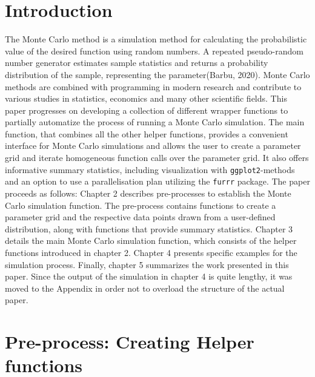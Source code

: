 \documentclass[11pt,a4paper]{article}
\begin{document}
\restoregeometry


{
\hypersetup{linkcolor=black}
\setcounter{tocdepth}{3}
\tableofcontents
}
\newpage
\listoftables
\newpage
\listoffigures
\newpage
{} 
\hypertarget{introduction}{%
\section{Introduction}\label{introduction}}

The Monte Carlo method is a simulation method for calculating the
probabilistic value of the desired function using random numbers. A
repeated pseudo-random number generator estimates sample statistics and
returns a probability distribution of the sample, representing the
parameter(Barbu, 2020). Monte Carlo methods are combined with
programming in modern research and contribute to various studies in
statistics, economics and many other scientific fields. This paper
progresses on developing a collection of different wrapper functions to
partially automatize the process of running a Monte Carlo simulation.
The main function, that combines all the other helper functions,
provides a convenient interface for Monte Carlo simulations and allows
the user to create a parameter grid and iterate homogeneous function
calls over the parameter grid. It also offers informative summary
statistics, including visualization with \texttt{ggplot2}-methods and an
option to use a parallelisation plan utilizing the \texttt{furrr}
package. The paper proceeds as follows: Chapter 2 describes
pre-processes to establish the Monte Carlo simulation function. The
pre-process contains functions to create a parameter grid and the
respective data points drawn from a user-defined distribution, along
with functions that provide summary statistics. Chapter 3 details the
main Monte Carlo simulation function, which consists of the helper
functions introduced in chapter 2. Chapter 4 presents specific examples
for the simulation process. Finally, chapter 5 summarizes the work
presented in this paper. Since the output of the simulation in chapter 4
is quite lengthy, it was moved to the Appendix in order not to overload
the structure of the actual paper.

\hypertarget{pre-process-creating-helper-functions}{%
\section{Pre-process: Creating Helper
functions}\label{pre-process-creating-helper-functions}}
\end{document}
